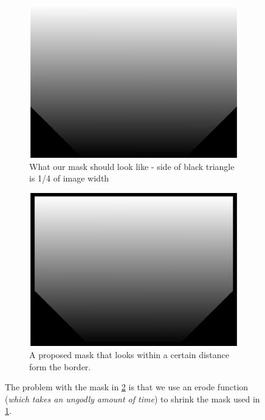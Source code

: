 \documentclass[10pt]{scrartcl}
\begin{document}
\begin{figure}[!ht]
    \centering
    \hspace{-1.0in}
    \begin{subfigure}[b]{.45\linewidth}
        \centering
        \includegraphics[width=1.3\textwidth]{../plots_tables_images/cutcorner.eps}
        \caption{What our mask should look like - side of black triangle is 1/4 of image width}
        \label{noborder}
    \end{subfigure}
    \hspace{.5in}
    \begin{subfigure}[b]{.45\linewidth}
        \centering
        \includegraphics[width=1.3\textwidth]{../plots_tables_images/cutcornerwborder.eps}
        \caption{A proposed mask that looks within a certain distance form the border.}
        \label{aborder}
    \end{subfigure}
    \caption{The problem with the mask in \ref{aborder} is that we use an erode function (\emph{which takes an ungodly amount of time}) to shrink the mask used in \ref{noborder}.}
    \label{cuttingcorners}
\end{figure}
\end{document}
